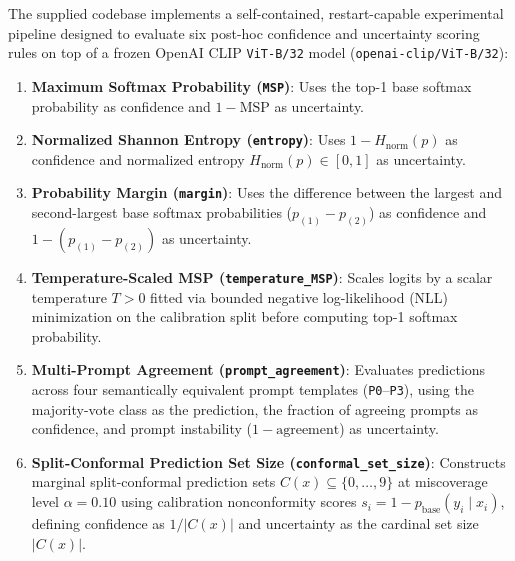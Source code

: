 \documentclass[11pt,a4paper]{article}
\begin{document}
The supplied codebase implements a self-contained, restart-capable experimental pipeline designed to evaluate six post-hoc confidence and uncertainty scoring rules on top of a frozen OpenAI CLIP \texttt{ViT-B/\allowbreak{}32} model (\texttt{openai-clip/\allowbreak{}ViT-B/\allowbreak{}32}):
\begin{enumerate}
  \item \textbf{Maximum Softmax Probability (\texttt{MSP})}: Uses the top-1 base softmax probability as confidence and $1 - \text{MSP}$ as uncertainty.
  \item \textbf{Normalized Shannon Entropy (\texttt{entropy})}: Uses $1 - H_{\text{norm}}(p)$ as confidence and normalized entropy $H_{\text{norm}}(p) \in [0, 1]$ as uncertainty.
  \item \textbf{Probability Margin (\texttt{margin})}: Uses the difference between the largest and second-largest base softmax probabilities ($p_{(1)} - p_{(2)}$) as confidence and $1 - (p_{(1)} - p_{(2)})$ as uncertainty.
  \item \textbf{Temperature-Scaled MSP (\texttt{temperature\_\allowbreak{}MSP})}: Scales logits by a scalar temperature $T > 0$ fitted via bounded negative log-likelihood (NLL) minimization on the calibration split before computing top-1 softmax probability.
  \item \textbf{Multi-Prompt Agreement (\texttt{prompt\_\allowbreak{}agreement})}: Evaluates predictions across four semantically equivalent prompt templates (\texttt{P0}--\texttt{P3}), using the majority-vote class as the prediction, the fraction of agreeing prompts as confidence, and prompt instability ($1 - \text{agreement}$) as uncertainty.
  \item \textbf{Split-Conformal Prediction Set Size (\texttt{conformal\_\allowbreak{}set\_\allowbreak{}size})}: Constructs marginal split-conformal prediction sets $C(x) \subseteq \{0, \dots, 9\}$ at miscoverage level $\alpha = 0.10$ using calibration nonconformity scores $s_i = 1 - p_{\text{base}}(y_i \mid x_i)$, defining confidence as $1 / |C(x)|$ and uncertainty as the cardinal set size $|C(x)|$.
\end{enumerate}
\end{document}

